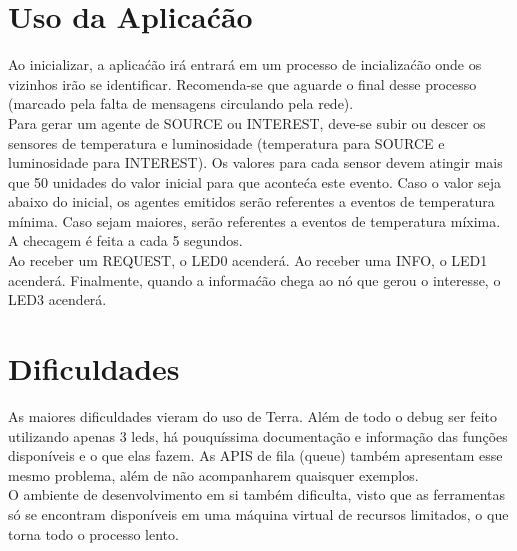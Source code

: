 \documentclass{article}
\begin{document}
\section{Uso da Aplica\'{c}\~{a}o}
	\tab Ao inicializar, a aplica\'{c}\~{a}o ir\'{a} entrar\'{a} em um processo de incializa\'{c}\~{a}o onde os vizinhos ir\~{a}o se identificar. Recomenda-se que aguarde o final desse processo (marcado pela falta de mensagens circulando pela rede).\\
		Para gerar um agente de SOURCE ou INTEREST, deve-se subir ou descer os sensores de temperatura e luminosidade (temperatura para SOURCE e luminosidade para INTEREST). Os valores para cada sensor devem atingir mais que 50 unidades do valor inicial para que aconte\'{c}a este evento. Caso o valor seja abaixo do inicial, os agentes emitidos ser\~{a}o referentes a eventos de temperatura m\'{i}nima. Caso sejam maiores, ser\~{a}o referentes a eventos de temperatura m\'{i}xima. A checagem \'{e} feita a cada 5 segundos.\\
		Ao receber um REQUEST, o LED0 acender\'{a}. Ao receber uma INFO, o LED1 acender\'{a}. Finalmente, quando a informa\'{c}\~{a}o chega ao n\'{o} que gerou o interesse, o LED3 acender\'{a}.
		
		
\section{Dificuldades}

	\tab As maiores dificuldades vieram do uso de Terra. Além de todo o debug ser feito utilizando apenas 3 leds, há pouquíssima documentação e informação das funções disponíveis e o que elas fazem. As APIS de fila (queue) tamb\'{e}m apresentam esse mesmo problema, al\'{em} de n\~{a}o acompanharem quaisquer exemplos.\\
		O ambiente de desenvolvimento em si tamb\'{em} dificulta, visto que as ferramentas s\'{o} se encontram dispon\'{i}veis em uma m\'{a}quina virtual de recursos limitados, o que torna todo o processo lento.


		
\end{document}
